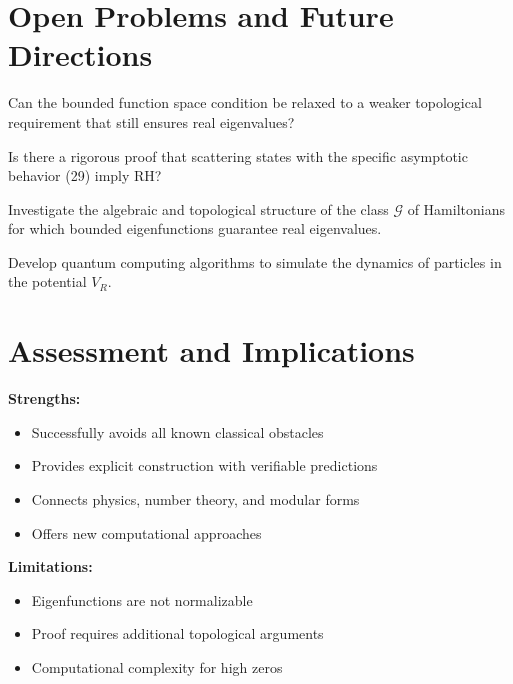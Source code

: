\section{Open Problems and Future Directions}

\begin{research_problem}
Can the bounded function space condition be relaxed to a weaker topological requirement that still ensures real eigenvalues?
\end{research_problem}

\begin{research_problem}
Is there a rigorous proof that scattering states with the specific asymptotic behavior (29) imply RH?
\end{research_problem}

\begin{research_direction}
Investigate the algebraic and topological structure of the class $\mathcal{G}$ of Hamiltonians for which bounded eigenfunctions guarantee real eigenvalues.
\end{research_direction}

\begin{research_direction}
Develop quantum computing algorithms to simulate the dynamics of particles in the potential $V_R$.
\end{research_direction}

\section{Assessment and Implications}

\begin{assessment}
\textbf{Strengths:}
\begin{itemize}
\item Successfully avoids all known classical obstacles
\item Provides explicit construction with verifiable predictions
\item Connects physics, number theory, and modular forms
\item Offers new computational approaches
\end{itemize}

\textbf{Limitations:}
\begin{itemize}
\item Eigenfunctions are not normalizable
\item Proof requires additional topological arguments
\item Computational complexity for high zeros
\end{itemize}
\end{assessment}

